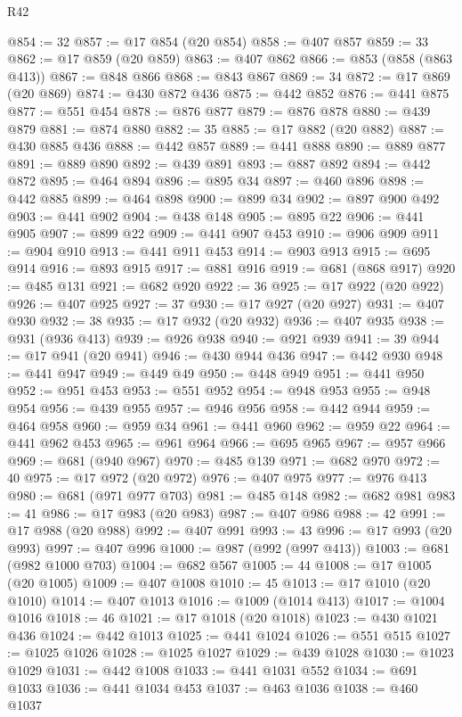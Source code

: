 \begin{lexlean}{R42}
\begin{coremodule}
@854 := 32
@857 := @17 @854 (@20 @854)
@858 := @407 @857
@859 := 33
@862 := @17 @859 (@20 @859)
@863 := @407 @862
@866 := @853 (@858 (@863 @413))
@867 := @848 @866
@868 := @843 @867
@869 := 34
@872 := @17 @869 (@20 @869)
@874 := @430 @872 @436
@875 := @442 @852
@876 := @441 @875
@877 := @551 @454
@878 := @876 @877
@879 := @876 @878
@880 := @439 @879
@881 := @874 @880
@882 := 35
@885 := @17 @882 (@20 @882)
@887 := @430 @885 @436
@888 := @442 @857
@889 := @441 @888
@890 := @889 @877
@891 := @889 @890
@892 := @439 @891
@893 := @887 @892
@894 := @442 @872
@895 := @464 @894
@896 := @895 @34
@897 := @460 @896
@898 := @442 @885
@899 := @464 @898
@900 := @899 @34
@902 := @897 @900 @492
@903 := @441 @902
@904 := @438 @148
@905 := @895 @22
@906 := @441 @905
@907 := @899 @22
@909 := @441 @907 @453
@910 := @906 @909
@911 := @904 @910
@913 := @441 @911 @453
@914 := @903 @913
@915 := @695 @914
@916 := @893 @915
@917 := @881 @916
@919 := @681 (@868 @917)
@920 := @485 @131
@921 := @682 @920
@922 := 36
@925 := @17 @922 (@20 @922)
@926 := @407 @925
@927 := 37
@930 := @17 @927 (@20 @927)
@931 := @407 @930
@932 := 38
@935 := @17 @932 (@20 @932)
@936 := @407 @935
@938 := @931 (@936 @413)
@939 := @926 @938
@940 := @921 @939
@941 := 39
@944 := @17 @941 (@20 @941)
@946 := @430 @944 @436
@947 := @442 @930
@948 := @441 @947
@949 := @449 @49
@950 := @448 @949
@951 := @441 @950
@952 := @951 @453
@953 := @551 @952
@954 := @948 @953
@955 := @948 @954
@956 := @439 @955
@957 := @946 @956
@958 := @442 @944
@959 := @464 @958
@960 := @959 @34
@961 := @441 @960
@962 := @959 @22
@964 := @441 @962 @453
@965 := @961 @964
@966 := @695 @965
@967 := @957 @966
@969 := @681 (@940 @967)
@970 := @485 @139
@971 := @682 @970
@972 := 40
@975 := @17 @972 (@20 @972)
@976 := @407 @975
@977 := @976 @413
@980 := @681 (@971 @977 @703)
@981 := @485 @148
@982 := @682 @981
@983 := 41
@986 := @17 @983 (@20 @983)
@987 := @407 @986
@988 := 42
@991 := @17 @988 (@20 @988)
@992 := @407 @991
@993 := 43
@996 := @17 @993 (@20 @993)
@997 := @407 @996
@1000 := @987 (@992 (@997 @413))
@1003 := @681 (@982 @1000 @703)
@1004 := @682 @567
@1005 := 44
@1008 := @17 @1005 (@20 @1005)
@1009 := @407 @1008
@1010 := 45
@1013 := @17 @1010 (@20 @1010)
@1014 := @407 @1013
@1016 := @1009 (@1014 @413)
@1017 := @1004 @1016
@1018 := 46
@1021 := @17 @1018 (@20 @1018)
@1023 := @430 @1021 @436
@1024 := @442 @1013
@1025 := @441 @1024
@1026 := @551 @515
@1027 := @1025 @1026
@1028 := @1025 @1027
@1029 := @439 @1028
@1030 := @1023 @1029
@1031 := @442 @1008
@1033 := @441 @1031 @552
@1034 := @691 @1033
@1036 := @441 @1034 @453
@1037 := @463 @1036
@1038 := @460 @1037

\end{coremodule}
\end{lexlean}
